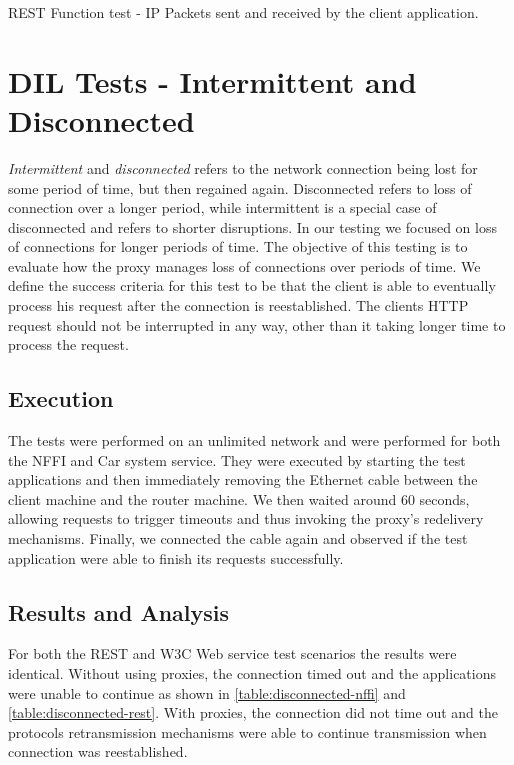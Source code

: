 \begin{table}[h]

\caption{REST Function test - IP Packets sent and received by the client application.}
\label{table:function-test-packets-rest}
\end{table}


\section{DIL Tests - Intermittent and Disconnected}

\textit{Intermittent} and \textit{disconnected} refers to the network connection
being lost for some period of time, but then regained again. Disconnected
refers to loss of connection over a longer period, while intermittent is a
special case of disconnected and refers to shorter disruptions. In our testing
we focused on loss of connections for longer periods of time. The objective of
this testing is to evaluate how the proxy manages loss of connections over
periods of time. We define the success criteria for this test to be that the
client is able to eventually process his request after the connection is
reestablished. The clients HTTP request should not be interrupted in any way,
other than it taking longer time to process the request.

\subsection{Execution}

 The tests were performed on an unlimited network and were performed for
 both the NFFI and Car system service. They were executed by starting the test
 applications and then immediately removing the Ethernet cable between the
 client machine and the router machine. We then waited around 60 seconds,
 allowing requests to trigger timeouts and thus invoking the proxy’s redelivery
 mechanisms. Finally, we connected the cable again and observed if the test
 application were able to finish its requests successfully.


\subsection{Results and Analysis}

For both the REST and W3C Web service test scenarios the results were identical.
Without using proxies, the connection timed out and the applications were unable
to continue as shown in \cref{table:disconnected-nffi} and
\cref{table:disconnected-rest}. With proxies, the connection did not time out
and the protocols retransmission mechanisms were able to continue transmission
when connection was reestablished.


